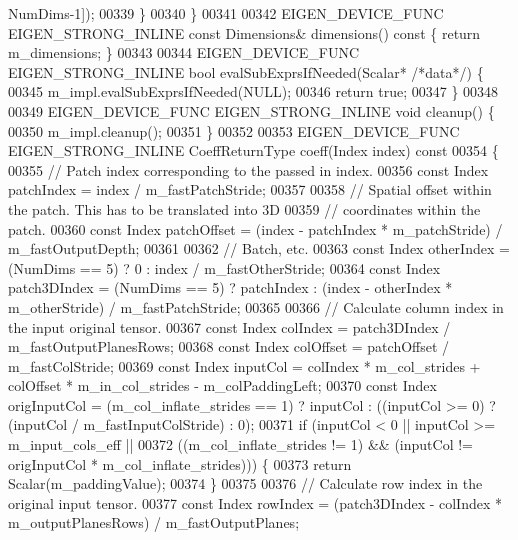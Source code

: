 \begin{DoxyCode}
      NumDims-1]);
00339     \}
00340   \}
00341 
00342   EIGEN\_DEVICE\_FUNC EIGEN\_STRONG\_INLINE \textcolor{keyword}{const} Dimensions& dimensions()\textcolor{keyword}{ const }\{ \textcolor{keywordflow}{return} m\_dimensions; \}
00343 
00344   EIGEN\_DEVICE\_FUNC EIGEN\_STRONG\_INLINE \textcolor{keywordtype}{bool} evalSubExprsIfNeeded(Scalar* \textcolor{comment}{/*data*/}) \{
00345     m\_impl.evalSubExprsIfNeeded(NULL);
00346     \textcolor{keywordflow}{return} \textcolor{keyword}{true};
00347   \}
00348 
00349   EIGEN\_DEVICE\_FUNC EIGEN\_STRONG\_INLINE \textcolor{keywordtype}{void} cleanup() \{
00350     m\_impl.cleanup();
00351   \}
00352 
00353   EIGEN\_DEVICE\_FUNC EIGEN\_STRONG\_INLINE CoeffReturnType coeff(Index index)\textcolor{keyword}{ const}
00354 \textcolor{keyword}{  }\{
00355     \textcolor{comment}{// Patch index corresponding to the passed in index.}
00356     \textcolor{keyword}{const} Index patchIndex = index / m\_fastPatchStride;
00357 
00358     \textcolor{comment}{// Spatial offset within the patch. This has to be translated into 3D}
00359     \textcolor{comment}{// coordinates within the patch.}
00360     \textcolor{keyword}{const} Index patchOffset = (index - patchIndex * m\_patchStride) / m\_fastOutputDepth;
00361 
00362     \textcolor{comment}{// Batch, etc.}
00363     \textcolor{keyword}{const} Index otherIndex = (NumDims == 5) ? 0 : index / m\_fastOtherStride;
00364     \textcolor{keyword}{const} Index patch3DIndex = (NumDims == 5) ? patchIndex : (index - otherIndex * m\_otherStride) / 
      m\_fastPatchStride;
00365 
00366     \textcolor{comment}{// Calculate column index in the input original tensor.}
00367     \textcolor{keyword}{const} Index colIndex = patch3DIndex / m\_fastOutputPlanesRows;
00368     \textcolor{keyword}{const} Index colOffset = patchOffset / m\_fastColStride;
00369     \textcolor{keyword}{const} Index inputCol = colIndex * m\_col\_strides + colOffset * m\_in\_col\_strides - m\_colPaddingLeft;
00370     \textcolor{keyword}{const} Index origInputCol = (m\_col\_inflate\_strides == 1) ? inputCol : ((inputCol >= 0) ? (inputCol / 
      m\_fastInputColStride) : 0);
00371     \textcolor{keywordflow}{if} (inputCol < 0 || inputCol >= m\_input\_cols\_eff ||
00372         ((m\_col\_inflate\_strides != 1) && (inputCol != origInputCol * m\_col\_inflate\_strides))) \{
00373       \textcolor{keywordflow}{return} Scalar(m\_paddingValue);
00374     \}
00375 
00376     \textcolor{comment}{// Calculate row index in the original input tensor.}
00377     \textcolor{keyword}{const} Index rowIndex = (patch3DIndex - colIndex * m\_outputPlanesRows) / m\_fastOutputPlanes;

\end{DoxyCode}
